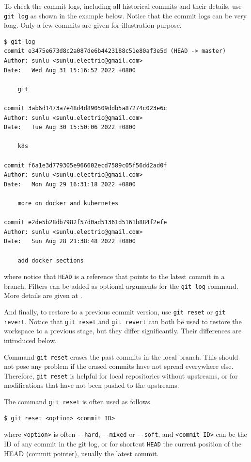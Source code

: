 To check the commit logs, including all historical commits and their details, use \verb|git log| as shown in the example below. Notice that the commit logs can be very long. Only a few commits are given for illustration purpose.
\begin{lstlisting}
$ git log
commit e3475e673d8c2a087de6b4423188c51e80af3e5d (HEAD -> master)
Author: sunlu <sunlu.electric@gmail.com>
Date:   Wed Aug 31 15:16:52 2022 +0800

    git

commit 3ab6d1473a7e48d4d890509ddb5a87274c023e6c
Author: sunlu <sunlu.electric@gmail.com>
Date:   Tue Aug 30 15:50:06 2022 +0800

    k8s

commit f6a1e3d779305e966602ecd7589c05f56dd2ad0f
Author: sunlu <sunlu.electric@gmail.com>
Date:   Mon Aug 29 16:31:18 2022 +0800

    more on docker and kubernetes

commit e2de5b28db7982f57d0ad51361d5161b884f2efe
Author: sunlu <sunlu.electric@gmail.com>
Date:   Sun Aug 28 21:38:48 2022 +0800

    add docker sections
\end{lstlisting}
where notice that \verb|HEAD| is a reference that points to the latest commit in a branch. Filters can be added as optional arguments for the \verb|git log| command. More details are given at \cite{git2025reference}.

And finally, to restore to a previous commit version, use \verb|git reset| or \verb|git revert|. Notice that \verb|git reset| and \verb|git revert| can both be used to restore the workspace to a previous stage, but they differ significantly. Their differences are introduced below.

Command \verb|git reset| erases the past commits in the local branch. This should not pose any problem if the erased commits have not spread everywhere else. Therefore, \verb|git reset| is helpful for local repositories without upstreams, or for modifications that have not been pushed to the upstreams. 

The command \verb|git reset| is often used as follows.
\begin{lstlisting}
$ git reset <option> <commit ID>
\end{lstlisting}
where \verb|<option>| is often \verb|--hard|, \verb|--mixed| or \verb|--soft|, and \verb|<commit ID>| can be the ID of any commit in the git log, or for shortcut \verb|HEAD| the current position of the HEAD (commit pointer), usually the latest commit.


